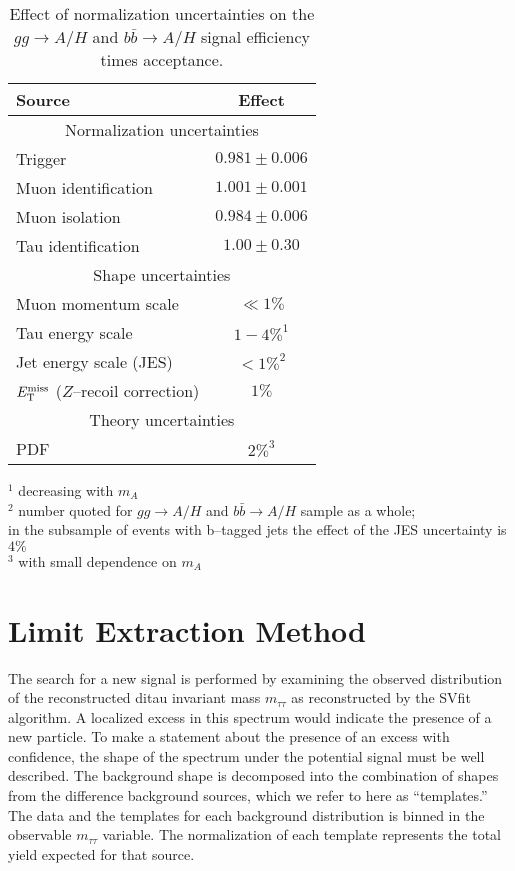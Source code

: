 \begin{table}[t]
\begin{center}
\tablesize
\begin{tabular}{|l|c|}
\hline
Source & Effect \\
\hline
\hline
\multicolumn{2}{|c|}{Normalization uncertainties} \\
\hline
Trigger                         & $0.981 \pm 0.006$ \\
Muon identification             & $1.001 \pm 0.001$ \\
Muon isolation                  & $0.984 \pm 0.006$ \\
Tau identification         & $1.00  \pm 0.30$ \\
\hline
\hline
\multicolumn{2}{|c|}{Shape uncertainties} \\
\hline
Muon momentum scale             & $\ll 1\%$ \\
Tau energy scale           & $1 - 4\%^{1}$ \\
Jet energy scale (JES)          & $< 1\%^{2}$ \\
$E_{\mathrm{T}}^{\text{miss}}$ ($Z$--recoil correction) & $1\%$ \\
\hline
\hline
\multicolumn{2}{|c|}{Theory uncertainties} \\
\hline
PDF & $2\%^{3}$ \\
\hline
\end{tabular}
\end{center}
$^{1}$ decreasing with $m_{A}$ \\
$^{2}$ number quoted for $gg \to A/H$ and $b\bar{b} \to A/H$ sample as a whole; \\
\hspace{5mm} in the subsample of events with b--tagged jets the effect of the JES uncertainty is $4\%$ \\
$^{3}$ with small dependence on $m_{A}$ \\
\begin{center}
\caption[Effect of normalization uncertainties on signal efficiency times
acceptance]{\captiontext Effect of normalization uncertainties on the $gg \to
A/H$ and $b\bar{b} \to A/H$ signal efficiency times acceptance.}
\label{tab:ExpUncertainties}
\end{center}
\end{table}
%
\section{Limit Extraction Method}
\label{sec:statmethod}
%
The search for a new signal is performed by examining the observed distribution
of the reconstructed ditau invariant mass $m_{\tau\tau}$ as reconstructed by the
SVfit algorithm.  A localized excess in this spectrum would indicate the
presence of a new particle.  To make a statement about the presence of an excess
with confidence, the shape of the spectrum under the potential signal must be well
described.  The background shape is decomposed into the combination of shapes
from the difference background sources, which we refer to here as ``templates.''
The data and the templates for each background distribution is binned in the
observable $m_{\tau\tau}$ variable.  The normalization of each template
represents the total yield expected for that source.

